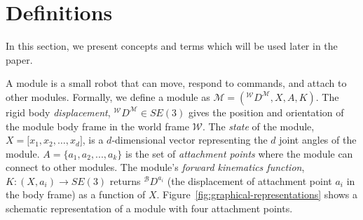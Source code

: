 \documentclass[graybox]{svmult}
\begin{document}
\section{Definitions}
\label{sec:preliminaries}
In this section, we present concepts and terms which will be used later in the paper.

\begin{definition}[Module] A module is a small robot that can move, respond to commands,
and attach to other modules.  Formally, we define a  module  as
$\mathcal{M}=({^\mathcal{W}}D^{\mathcal{M}}, X, A,K)$.
The rigid body \textit{displacement}, ${^\mathcal{W}}D^{\mathcal{M}}\in SE(3)$ 
gives the position and orientation of the module body frame in the world  frame $\mathcal{W}$.
The \textit{state} of the module, \(X=\lbrack x_1, x_2, \ldots, x_d \rbrack\),
 is a \(d\)-dimensional vector representing the \(d\) joint angles of the module.
$A=\{a_1, a_2, ..., a_k\}$ is the set of \textit{attachment points} where the 
module can connect to other modules.
The  module's \textit{forward kinematics function}, \(K: (X, a_i) \rightarrow SE(3) \) 
returns \({^\mathcal{B}}D^{a_{i}}\) (the displacement of attachment point \(a_i\) 
in the body frame) as a function of \(X\).
%
Figure~\ref{fig:graphical-representations} shows a schematic representation of a module with  four attachment points.
\end{definition}
%
\end{document}
